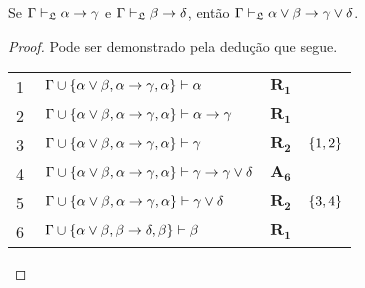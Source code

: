 \vspace{\baselineskip}
\begin{tcolorbox}[enhanced jigsaw, breakable, sharp corners, colframe=black, colback=white, boxrule=0.5pt, left=1.5mm, right=1.5mm, top=1.5mm, bottom=1.5mm]
    \begin{lemma}\label{disjunction.exchange}
        Se $\Gamma\mathrel{\vdash}_\mathfrak{L}\alpha\to\gamma$ e $\Gamma\mathrel{\vdash}_\mathfrak{L}\beta\to\delta$, então $\Gamma\mathrel{\vdash}_\mathfrak{L}\alpha\vee\beta\to\gamma\vee\delta$.
        \begin{proof}
        Pode ser demonstrado pela dedução que segue.

        \vspace{0.5\baselineskip}
        \footnotesize
        \setlength{\rowskip}{0.5\baselineskip}
        \begin{xltabular}{\textwidth}{r | X l l}
            \scriptsize{\phantom{0}1}\phantom{ } & $\ \Gamma\cup\set{\alpha\vee\beta,\alpha\to\gamma,\alpha}\vdash\alpha$                                                                  & $\hyperref[modal.rule.1]{\mathbf{R_1}}$\phantom{1} & \\[\rowskip]
            \scriptsize{\phantom{0}2}\phantom{ } & $\ \Gamma\cup\set{\alpha\vee\beta,\alpha\to\gamma,\alpha}\vdash\alpha\to\gamma$                                                         & $\hyperref[modal.rule.1]{\mathbf{R_1}}$            & \\[\rowskip]
            \scriptsize{\phantom{0}3}\phantom{ } & $\ \Gamma\cup\set{\alpha\vee\beta,\alpha\to\gamma,\alpha}\vdash\gamma$                                                                  & $\hyperref[modal.rule.2]{\mathbf{R_2}}$            & $\left\{1,2\right\}$\\[\rowskip]
            \scriptsize{\phantom{0}4}\phantom{ } & $\ \Gamma\cup\set{\alpha\vee\beta,\alpha\to\gamma,\alpha}\vdash\gamma\to\gamma\vee\delta$                                               & $\hyperref[modal.axiom.6]{\mathbf{A_6}}$           & \\[\rowskip]
            \scriptsize{\phantom{0}5}\phantom{ } & $\ \Gamma\cup\set{\alpha\vee\beta,\alpha\to\gamma,\alpha}\vdash\gamma\vee\delta$                                                        & $\hyperref[modal.rule.2]{\mathbf{R_2}}$            & $\left\{3,4\right\}$\\[\rowskip]
            \scriptsize{\phantom{0}6}\phantom{ } & $\ \Gamma\cup\set{\alpha\vee\beta,\beta\to\delta,\beta}\vdash\beta$                                                                     & $\hyperref[modal.rule.1]{\mathbf{R_1}}$            & \\[\rowskip]

\end{xltabular}
\end{proof}
\end{lemma}
\end{tcolorbox}
